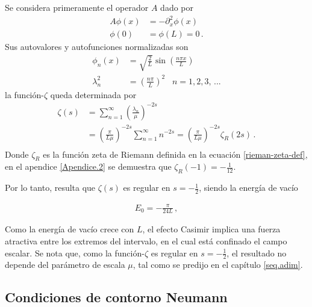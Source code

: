 Se considera primeramente el operador $A$ dado por
\begin{equation}
\begin{aligned}
	A \phi (x) &= - \partial _x ^2 \phi (x) \\[10pt]
    \phi (0) &= \phi(L) = 0 
    \, .
\end{aligned}
\end{equation}
Sus autovalores y autofunciones normalizadas son
\begin{equation}
\begin{aligned}
	\phi _n (x) &= \sqrt{\frac{2}{L}} \sin \left( \frac{n \pi x}{L} \right) \\[10pt]
	\lambda ^2 _n  &= \left( \frac{n \pi }{L} \right) ^2 \, \, \, \, \, n = 1,2,3, \, ...
\end{aligned}
\end{equation}
la  función-$\zeta$ queda determinada por
\begin{equation}
\begin{aligned}
\zeta  (s) &= 
\sum _{n=1} ^{\infty} \left( \frac{\lambda _n }{\mu }  \right) ^{-2s}  \\[10pt]
&= \left(  \frac{\pi}{L \mu} \right) ^{-2s}   \sum _{n=1} ^{\infty} n ^{-2s} = 
\left( \frac{\pi}{L \mu} \right) ^{-2s}  \zeta _R (2s) \, . \\[10pt]
\end{aligned}
\end{equation}
Donde $\zeta _R$ es la función zeta de Riemann definida en la ecuación \ref{rieman-zeta-def}, en el apendice \ref{Apendice.2} se demuestra  que $\zeta _R (-1) = - \frac{1}{12}$. 

Por lo tanto, resulta que $\zeta (s)$ es regular en $s=-\frac{1}{2}$, siendo la energía de vacío

\begin{equation}\label{eq.energia.dirichlet}
\begin{array}{c}
E _0 = - \frac{\pi}{24 L} \, ,
\end{array}
\end{equation}


Como la energía de vacío crece con $L$, el efecto Casimir implica una fuerza
atractiva entre los extremos del intervalo, en el cual está confinado el campo
escalar. Se nota que, como la  función-$\zeta$ es regular en $s=-\frac{1}{2}$, el resultado no depende del parámetro de escala $\mu$, tal como se predijo en el capítulo \ref{seq.adim}.\\

\subsection*{Condiciones de contorno Neumann}


